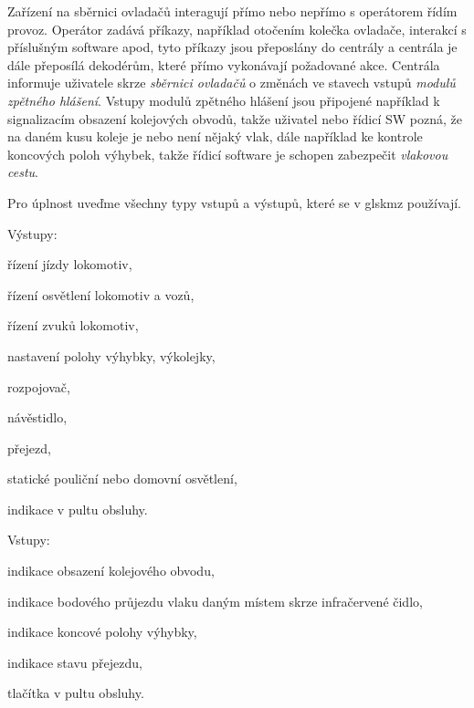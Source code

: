 Zařízení na sběrnici ovladačů interagují přímo nebo nepřímo s operátorem řídím
provoz. Operátor zadává příkazy, například otočením kolečka ovladače, interakcí
s příslušným software apod, tyto příkazy jsou přeposlány do centrály a centrála
je dále přeposílá dekodérům, které přímo vykonávají požadované akce. Centrála
informuje uživatele skrze \textit{sběrnici ovladačů} o změnách ve stavech
vstupů \textit{modulů zpětného hlášení}. Vstupy modulů zpětného hlášení jsou
připojené například k signalizacím obsazení kolejových obvodů, takže uživatel
nebo řídicí SW pozná, že na daném kusu koleje je nebo není nějaký vlak, dále
například ke kontrole koncových poloh výhybek, takže řídicí software je schopen
zabezpečit \textit{vlakovou cestu}.

Pro úplnost uveďme všechny typy vstupů a výstupů, které se v gls{kmz} používají.

Výstupy:

\begin{compactitem}
\item řízení jízdy lokomotiv,
\item řízení osvětlení lokomotiv a vozů,
\item řízení zvuků lokomotiv,
\item nastavení polohy výhybky, výkolejky,
\item rozpojovač,
\item návěstidlo,
\item přejezd,
\item statické pouliční nebo domovní osvětlení,
\item indikace v pultu obsluhy.
\end{compactitem}

Vstupy:

\begin{compactitem}
\item indikace obsazení kolejového obvodu,
\item indikace bodového průjezdu vlaku daným místem skrze infračervené čidlo,
\item indikace koncové polohy výhybky,
\item indikace stavu přejezdu,
\item tlačítka v pultu obsluhy.
\end{compactitem}

